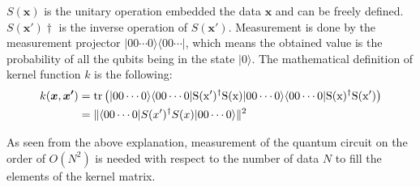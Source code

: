 $S(\bm{x})$ is the unitary operation embedded the data $\bm{x}$ and can be freely defined.  $S(\bm{x'})\dagger$ is the inverse operation of $S(\bm{x'})$. Measurement is done by the measurement projector $|00\cdots0\rangle\langle00\cdots|$, which means the obtained value is the probability of all the qubits being in the state $|0\rangle$. The mathematical definition of kernel function $k$ is the following:
$$
\begin{aligned}
k(\bm{x},\bm{x'})&=\rm{tr} \left(|00\cdots 0\rangle\langle00\cdots 0|S(x')^\dagger S(x)|00\cdots 0\rangle \langle 00\cdots 0| S(x)^\dagger S(x')\right)\\
&=\|\langle 00\cdots 0|S(x')^\dagger S(x)|00\cdots 0\rangle\|^2\\
\end{aligned}$$

\par As seen from the above explanation, measurement of the quantum circuit on the order of $O(N^2)$ is needed with respect to the number of data $N$ to fill the elements of the kernel matrix. 